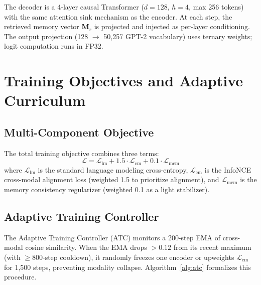 The decoder is a 4-layer causal Transformer ($d{=}128$, $h{=}4$, max 256 tokens) with the same attention sink mechanism as the encoder. At each step, the retrieved memory vector $\mathbf{M}_r$ is projected and injected as per-layer conditioning. The output projection (128 $\rightarrow$ 50{,}257 GPT-2 vocabulary) uses ternary weights; logit computation runs in FP32.

\section{Training Objectives and Adaptive Curriculum}
\label{sec:bitmar_training}

\subsection{Multi-Component Objective}
The total training objective combines three terms:
\begin{equation}
    \mathcal{L} = \mathcal{L}_{\text{lm}} + 1.5 \cdot \mathcal{L}_{\text{cm}} + 0.1 \cdot \mathcal{L}_{\text{mem}}
    \label{eq:bitmar_total}
\end{equation}
where $\mathcal{L}_{\text{lm}}$ is the standard language modeling cross-entropy, $\mathcal{L}_{\text{cm}}$ is the InfoNCE cross-modal alignment loss (weighted 1.5 to prioritize alignment), and $\mathcal{L}_{\text{mem}}$ is the memory consistency regularizer (weighted 0.1 as a light stabilizer).

\subsection{Adaptive Training Controller}
The Adaptive Training Controller (ATC) monitors a 200-step EMA of cross-modal cosine similarity. When the EMA drops $>0.12$ from its recent maximum (with $\geq$800-step cooldown), it randomly freezes one encoder or upweights $\mathcal{L}_{\text{cm}}$ for 1{,}500 steps, preventing modality collapse. Algorithm~\ref{alg:atc} formalizes this procedure.

